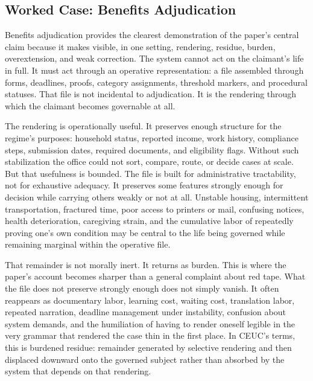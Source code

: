 \documentclass[11pt]{article}
\begin{document}
\subsection{Worked Case: Benefits Adjudication}

Benefits adjudication provides the clearest demonstration of the paper's central claim because it makes visible, in one setting, rendering, residue, burden, overextension, and weak correction. The system cannot act on the claimant's life in full. It must act through an operative representation: a file assembled through forms, deadlines, proofs, category assignments, threshold markers, and procedural statuses. That file is not incidental to adjudication. It is the rendering through which the claimant becomes governable at all. \cite{MoynihanHerdHarvey2015AdministrativeBurden,Eubanks2018AutomatingInequality,BowkerStar1999SortingThingsOut}

The rendering is operationally useful. It preserves enough structure for the regime's purposes: household status, reported income, work history, compliance steps, submission dates, required documents, and eligibility flags. Without such stabilization the office could not sort, compare, route, or decide cases at scale. But that usefulness is bounded. The file is built for administrative tractability, not for exhaustive adequacy. It preserves some features strongly enough for decision while carrying others weakly or not at all. Unstable housing, intermittent transportation, fractured time, poor access to printers or mail, confusing notices, health deterioration, caregiving strain, and the cumulative labor of repeatedly proving one's own condition may be central to the life being governed while remaining marginal within the operative file.

That remainder is not morally inert. It returns as burden. This is where the paper's account becomes sharper than a general complaint about red tape. What the file does not preserve strongly enough does not simply vanish. It often reappears as documentary labor, learning cost, waiting cost, translation labor, repeated narration, deadline management under instability, confusion about system demands, and the humiliation of having to render oneself legible in the very grammar that rendered the case thin in the first place. In CEUC's terms, this is burdened residue: remainder generated by selective rendering and then displaced downward onto the governed subject rather than absorbed by the system that depends on that rendering. \cite{MoynihanHerdHarvey2015AdministrativeBurden,Eubanks2018AutomatingInequality}
\end{document}
